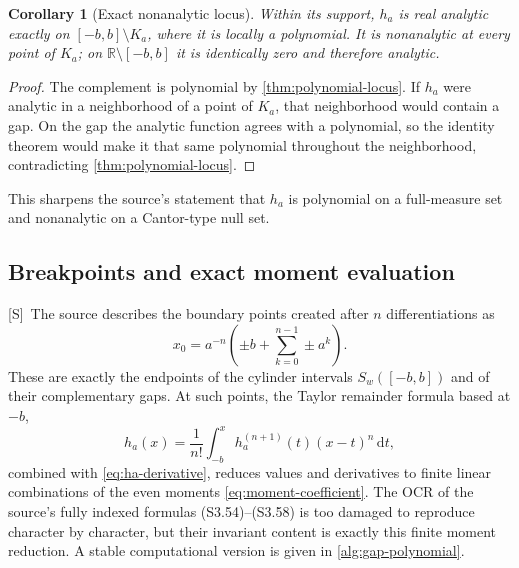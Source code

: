 \documentclass[11pt,oneside]{article}
\newtheorem{corollary}[theorem]{Corollary}
\theoremstyle{definition}
\theoremstyle{remark}
\newcommand{\R}{\mathbb R}
\newcommand{\dd}{\,\mathrm d}
\newcommand{\Smark}{\textcolor{sourceblue}{\textsf{[S]}}}
\begin{document}
\begin{corollary}[Exact nonanalytic locus]
\label{cor:nonanalytic-locus}
Within its support, $h_a$ is real analytic exactly on $[-b,b]\setminus K_a$, where it is
locally a polynomial.  It is nonanalytic at every point of $K_a$; on
$\R\setminus[-b,b]$ it is identically zero and therefore analytic.
\end{corollary}

\begin{proof}
The complement is polynomial by \cref{thm:polynomial-locus}.  If $h_a$ were analytic in a
neighborhood of a point of $K_a$, that neighborhood would contain a gap.  On the gap the
analytic function agrees with a polynomial, so the identity theorem would make it that same
polynomial throughout the neighborhood, contradicting \cref{thm:polynomial-locus}.
\end{proof}

This sharpens the source's statement that $h_a$ is polynomial on a full-measure set and
nonanalytic on a Cantor-type null set.

\subsection{Breakpoints and exact moment evaluation}

\Smark\ The source describes the boundary points created after $n$ differentiations as
\begin{equation}
 x_0=a^{-n}\left(\pm b+\sum_{k=0}^{n-1}\pm a^k\right).
 \tag{S3.50}
 \label{eq:source-breakpoints}
\end{equation}
These are exactly the endpoints of the cylinder intervals $S_w([-b,b])$ and of their
complementary gaps.  At such points, the Taylor remainder formula based at $-b$,
\begin{equation}
 h_a(x)=\frac1{n!}\int_{-b}^{x}h_a^{(n+1)}(t)(x-t)^n\dd t,
 \label{eq:Taylor-endpoint}
\end{equation}
combined with \eqref{eq:ha-derivative}, reduces values and derivatives to finite linear
combinations of the even moments \eqref{eq:moment-coefficient}.  The OCR of the source's
fully indexed formulas (S3.54)--(S3.58) is too damaged to reproduce character by character,
but their invariant content is exactly this finite moment reduction.  A stable computational
version is given in \cref{alg:gap-polynomial}.
\end{document}
